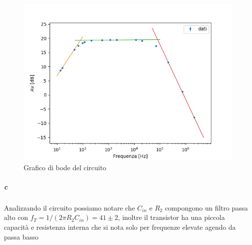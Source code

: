 \documentclass[10pt,a4paper]{article}
\begin{document}
\begin{figure}
	\centering
    \includegraphics[scale=0.8]{fit.png} 
    \caption{Grafico di bode del circuito}
    \label{fig:fit}
\end{figure}
    
\subparagraph{c}
Analizzando il circuito possiamo notare che $C_{in}$ e $R_2$ compongono un filtro passa alto con $f_T=1/(2\pi R_2 C_{in})=41\pm 2$, inoltre il transistor ha una piccola capacità e resistenza interna che si nota solo per frequenze elevate agendo da passa basso
		
\end{document}
